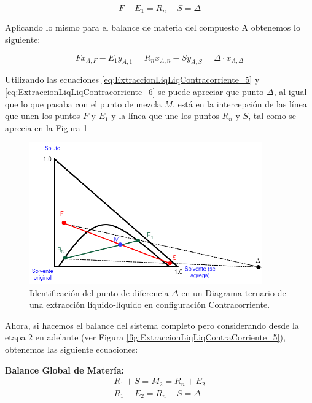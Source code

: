 \documentclass[11pt]{book}
\begin{document}
\begin{equation}
    \label{eq:ExtraccionLiqLiqContracorriente_5}
    F - E_1 = R_n - S = \Delta
\end{equation}

Aplicando lo mismo para el balance de materia del compuesto A obtenemos lo siguiente:

\begin{equation}
    \label{eq:ExtraccionLiqLiqContracorriente_6}
    F x_{A,F} - E_1 y_{A,1} = R_n x_{A,n} - S y_{A,S} = \Delta \cdot x_{A,\Delta}
\end{equation}

Utilizando las ecuaciones \ref{eq:ExtraccionLiqLiqContracorriente_5} y \ref{eq:ExtraccionLiqLiqContracorriente_6} se puede apreciar que punto $\Delta$, al igual que lo que pasaba con el punto de mezcla $M$, está en la intercepción de las línea que unen los puntos $F$ y $E_1$ y la línea que une los puntos $R_n$ y $S$, tal como se aprecia en la Figura \ref{fig:ExtraccionLiqLiqContraCorriente_4}

\begin{figure}[H]
    \centering
    \includegraphics[width = 10cm]{img/LiquidoLiquido/ExtraccionLiqLiq_ContraCorriente_4.PNG}
    \caption{Identificación del punto de diferencia $\Delta$ en un Diagrama ternario de una extracción líquido-líquido en configuración Contracorriente.}
    \label{fig:ExtraccionLiqLiqContraCorriente_4}
\end{figure}

Ahora, si hacemos el balance del sistema completo pero considerando desde la etapa 2 en adelante (ver Figura \ref{fig:ExtraccionLiqLiqContraCorriente_5}), obtenemos las siguiente ecuaciones:

\textbf{Balance Global de Matería:}
\begin{align}
    \label{eq:ExtraccionLiqLiqContracorriente_7}
    R_1 + S = M_2 = R_n + E_2 \\
    R_1 - E_2 = R_n - S = \Delta
\end{align}
\end{document}
